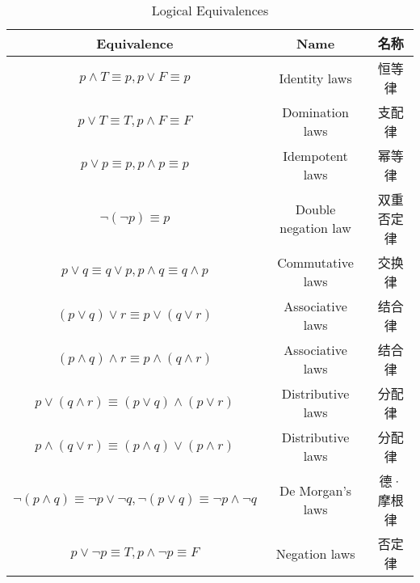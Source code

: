 \documentclass[12pt, a4paper]{article} %
\begin{document}
\begin{table}[H]
    \centering
    \caption{Logical Equivalences}
    \begin{tabular}{c|cc}
        \toprule
        Equivalence                                                                                & Name                & 名称       \\
        \midrule
        $p \wedge T \equiv p, p \vee F \equiv p$                                                   & Identity laws       & 恒等律     \\
        $p \vee T \equiv T, p \wedge F \equiv F$                                                   & Domination laws     & 支配律     \\
        $p \vee p \equiv p, p \wedge p \equiv p$                                                   & Idempotent laws     & 幂等律     \\
        $\neg (\neg p) \equiv p$                                                                   & Double negation law & 双重否定律 \\
        $p \vee q \equiv q \vee p, p \wedge q \equiv q \wedge p$                                   & Commutative laws    & 交换律     \\
        $(p \vee q) \vee r \equiv p \vee (q \vee r)$                                               & Associative laws    & 结合律     \\
        $(p \wedge q) \wedge r \equiv p \wedge (q \wedge r)$                                       & Associative laws    & 结合律     \\
        $p \vee (q \wedge r) \equiv (p \vee q) \wedge (p \vee r)$                                  & Distributive laws   & 分配律     \\
        $p \wedge (q \vee r) \equiv (p \wedge q) \vee (p \wedge r)$                                & Distributive laws   & 分配律     \\
        $\neg (p \wedge q) \equiv \neg p \vee \neg q, \neg (p \vee q) \equiv \neg p \wedge \neg q$ & De Morgan's laws    & 德·摩根律  \\
        $p \vee \neg p \equiv T, p \wedge \neg p \equiv F$                                         & Negation laws       & 否定律     \\
        \bottomrule
    \end{tabular}%
    \label{tab:10}%
\end{table}%
\end{document}
